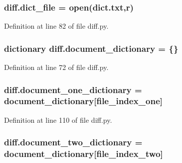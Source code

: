 \subsubsection[{\texorpdfstring{dict\+\_\+file}{dict_file}}]{\setlength{\rightskip}{0pt plus 5cm}diff.\+dict\+\_\+file = open(\textquotesingle{}dict.\+txt\textquotesingle{},\textquotesingle{}r\textquotesingle{})}\hypertarget{namespacediff_a1c4dd03a1a71df999349462c9dd9994d}{}\label{namespacediff_a1c4dd03a1a71df999349462c9dd9994d}


Definition at line 82 of file diff.\+py.

\subsubsection[{\texorpdfstring{document\+\_\+dictionary}{document_dictionary}}]{\setlength{\rightskip}{0pt plus 5cm}dictionary diff.\+document\+\_\+dictionary = \{\}}\hypertarget{namespacediff_a7d02a567fcd601900d3960bef0191cea}{}\label{namespacediff_a7d02a567fcd601900d3960bef0191cea}


Definition at line 72 of file diff.\+py.

\subsubsection[{\texorpdfstring{document\+\_\+one\+\_\+dictionary}{document_one_dictionary}}]{\setlength{\rightskip}{0pt plus 5cm}diff.\+document\+\_\+one\+\_\+dictionary = {\bf document\+\_\+dictionary}\mbox{[}{\bf file\+\_\+index\+\_\+one}\mbox{]}}\hypertarget{namespacediff_aa4da046a613de2dafe03d105bca31694}{}\label{namespacediff_aa4da046a613de2dafe03d105bca31694}


Definition at line 110 of file diff.\+py.

\subsubsection[{\texorpdfstring{document\+\_\+two\+\_\+dictionary}{document_two_dictionary}}]{\setlength{\rightskip}{0pt plus 5cm}diff.\+document\+\_\+two\+\_\+dictionary = {\bf document\+\_\+dictionary}\mbox{[}{\bf file\+\_\+index\+\_\+two}\mbox{]}}\hypertarget{namespacediff_a00ac707250a54a82a970c2bb2acf736a}{}\label{namespacediff_a00ac707250a54a82a970c2bb2acf736a}


